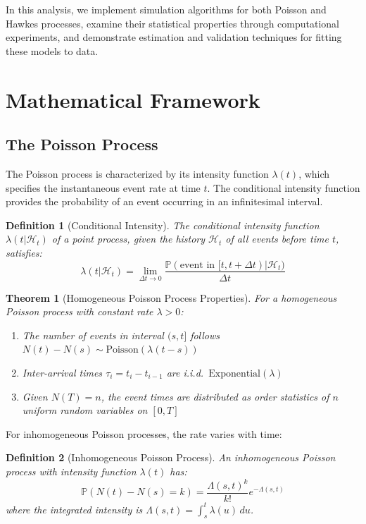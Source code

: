 \documentclass[a4paper, 11pt]{article}
\newtheorem{definition}{Definition}[section]
\newtheorem{theorem}{Theorem}[section]
\begin{document}
In this analysis, we implement simulation algorithms for both Poisson and Hawkes
processes, examine their statistical properties through computational experiments,
and demonstrate estimation and validation techniques for fitting these models to data.

\section{Mathematical Framework}

\subsection{The Poisson Process}

The Poisson process is characterized by its intensity function $\lambda(t)$, which
specifies the instantaneous event rate at time $t$. The conditional intensity function
provides the probability of an event occurring in an infinitesimal interval.

\begin{definition}[Conditional Intensity]
The conditional intensity function $\lambda(t|\mathcal{H}_t)$ of a point process,
given the history $\mathcal{H}_t$ of all events before time $t$, satisfies:
\begin{equation}
\lambda(t|\mathcal{H}_t) = \lim_{\Delta t \to 0} \frac{\mathbb{P}(\text{event in } [t, t+\Delta t) | \mathcal{H}_t)}{\Delta t}
\end{equation}
\end{definition}

\begin{theorem}[Homogeneous Poisson Process Properties]
For a homogeneous Poisson process with constant rate $\lambda > 0$:
\begin{enumerate}
\item The number of events in interval $(s, t]$ follows $N(t) - N(s) \sim \text{Poisson}(\lambda(t-s))$
\item Inter-arrival times $\tau_i = t_i - t_{i-1}$ are i.i.d.\ $\text{Exponential}(\lambda)$
\item Given $N(T) = n$, the event times are distributed as order statistics of $n$ uniform random variables on $[0, T]$
\end{enumerate}
\end{theorem}

For inhomogeneous Poisson processes, the rate varies with time:

\begin{definition}[Inhomogeneous Poisson Process]
An inhomogeneous Poisson process with intensity function $\lambda(t)$ has:
\begin{equation}
\mathbb{P}(N(t) - N(s) = k) = \frac{\Lambda(s,t)^k}{k!} e^{-\Lambda(s,t)}
\end{equation}
where the integrated intensity is $\Lambda(s,t) = \int_s^t \lambda(u) \, du$.
\end{definition}
\end{document}
